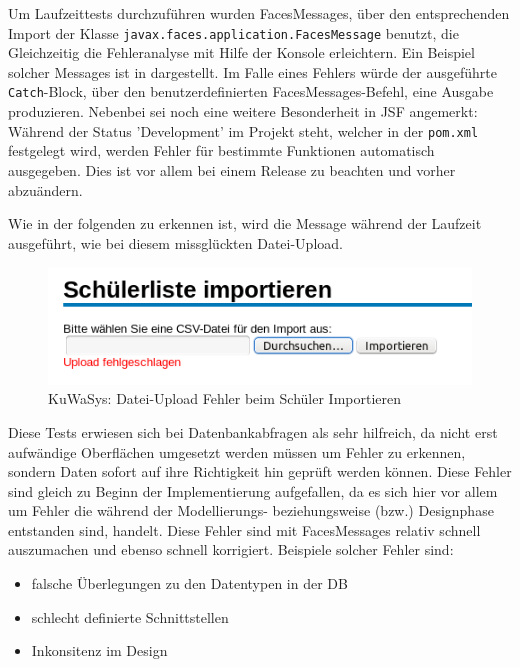 Um Laufzeittests durchzuführen wurden FacesMessages, über den entsprechenden Import der Klasse \texttt{javax.faces.application.FacesMessage} benutzt, die Gleichzeitig die Fehleranalyse mit Hilfe der Konsole erleichtern.
Ein Beispiel solcher Messages ist in  dargestellt. Im Falle eines Fehlers würde der ausgeführte \texttt{Catch}-Block, über den benutzerdefinierten FacesMessages-Befehl, eine Ausgabe produzieren.
Nebenbei sei noch eine weitere Besonderheit in JSF angemerkt:
Während der Status 'Development' im  Projekt steht, welcher in der \texttt{pom.xml} festgelegt wird, werden Fehler für bestimmte Funktionen automatisch ausgegeben. Dies ist vor allem bei einem Release zu beachten und vorher abzuändern.

	
	
Wie in der folgenden  zu erkennen ist, wird die Message während der Laufzeit ausgeführt, wie bei diesem missglückten Datei-Upload.

\begin{figure}[H]
 \begin{center}
   \includegraphics[scale=0.8]{img/SchulerImportieren_KuWaSys.png}
 \end{center}
 \caption[\textbf{KuWaSys: Datei-Upload Fehler beim Schüler Importieren}]{KuWaSys: Datei-Upload Fehler beim Schüler Importieren}
 \label{figmin:SchulerImportieren_KuWaSys}
 \label{fig:SchulerImportieren_KuWaSys}
\end{figure}

Diese Tests erwiesen sich bei Datenbankabfragen als sehr hilfreich, da nicht erst aufwändige Oberflächen umgesetzt werden müssen um Fehler zu erkennen, sondern Daten sofort auf ihre Richtigkeit hin geprüft werden können.
Diese Fehler sind gleich zu Beginn der Implementierung aufgefallen, da es sich hier vor allem um Fehler die während der Modellierungs- beziehungsweise (bzw.) Designphase entstanden sind, handelt. Diese Fehler sind mit FacesMessages relativ schnell auszumachen und ebenso schnell korrigiert. Beispiele solcher Fehler sind:
\begin{itemize}
  \item falsche Überlegungen zu den Datentypen in der \ac{DB}
  \item schlecht definierte Schnittstellen
  \item Inkonsitenz im Design 
\end{itemize}

